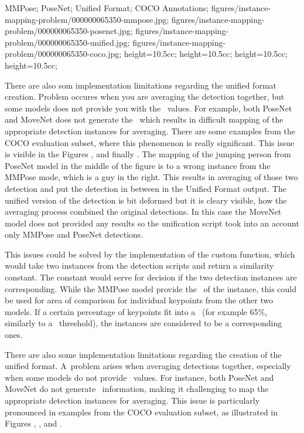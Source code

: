     {
        MMPose;
        PoseNet;
        Unified Format;
        COCO Annotations;
    }
    {
        figures/instance-mapping-problem/000000065350-mmpose.jpg;
        figures/instance-mapping-problem/000000065350-posenet.jpg;
        figures/instance-mapping-problem/000000065350-unified.jpg;
        figures/instance-mapping-problem/000000065350-coco.jpg;
    }
    {
        height=10.5cc;
        height=10.5cc;
        height=10.5cc;
        height=10.5cc;
    }

There are also som implementation limitations regarding the unified format creation. Problem occures when you are averaging the detection together, but some models does not provide you with the \BBOX\ values. For example, both PoseNet and MoveNet does not generate the \BBOX\ which results in difficult mapping of the appropriate detection instances for averaging. There are some examples from the COCO evaluation subset, where this phenomenon is really significant. This issue is visible in the Figures ,  and finally . The mapping of the jumping person from PoseNet model in the middle of the figure is to a wrong instance from the MMPose mode, which is a guy in the right. This results in averaging of those two detection and put the detection in between in the Unified Format output. The unified version of the detection is bit deformed but it is cleary visible, how the averaging process combined the original detections. In this case the MoveNet model does not provided any results so the unification script took into an account only MMPose and PoseNet detections.

This issues could be solved by the implementation of the custom function, which would take two instances from the detection scripts and return a similarity constant. The constant would serve for decision if the two detection instances are corresponding. While the MMPose model provide the \BBOX\ of the instance, this could be used for area of comparison for individual keypoints from the other two models. If a certain percentage of keypoints fit into a \BBOX\ (for example 65\%, similarly to a \IoU\ threshold), the instances are considered to be a corresponding ones.

There are also some implementation limitations regarding the creation of the unified format. A~problem arises when averaging detections together, especially when some models do not provide \BBOX\ values. For instance, both PoseNet and MoveNet do not generate \BBOX\ information, making it challenging to map the appropriate detection instances for averaging. This issue is particularly pronounced in examples from the COCO evaluation subset, as illustrated in Figures , , and .

